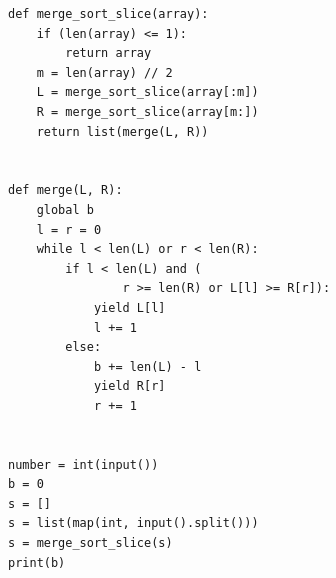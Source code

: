 



\begin{latin}
\begin{lstlisting}
def merge_sort_slice(array):
    if (len(array) <= 1):
        return array
    m = len(array) // 2
    L = merge_sort_slice(array[:m])
    R = merge_sort_slice(array[m:])
    return list(merge(L, R))


def merge(L, R):
    global b
    l = r = 0
    while l < len(L) or r < len(R):
        if l < len(L) and (
                r >= len(R) or L[l] >= R[r]):
            yield L[l]
            l += 1
        else:
            b += len(L) - l
            yield R[r]
            r += 1


number = int(input())
b = 0
s = []
s = list(map(int, input().split()))
s = merge_sort_slice(s)
print(b)
\end{lstlisting}
\end{latin}

